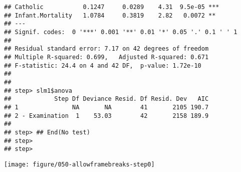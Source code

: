 \documentclass{beamer}\usepackage{graphicx, color}
\makeatletter
\def\maxwidth{ %
  \ifdim\Gin@nat@width>\linewidth
    \linewidth
  \else
    \Gin@nat@width
  \fi
}
\newenvironment{knitrout}{}{} %
\makeatother
\begin{document}
\begin{frame}
\begin{knitrout}
\begin{verbatim}
## Catholic           0.1247     0.0289    4.31  9.5e-05 ***
## Infant.Mortality   1.0784     0.3819    2.82   0.0072 ** 
## ---
## Signif. codes:  0 '***' 0.001 '**' 0.01 '*' 0.05 '.' 0.1 ' ' 1 
## 
## Residual standard error: 7.17 on 42 degrees of freedom
## Multiple R-squared: 0.699,	Adjusted R-squared: 0.671 
## F-statistic: 24.4 on 4 and 42 DF,  p-value: 1.72e-10 
## 
## 
## step> slm1$anova
##            Step Df Deviance Resid. Df Resid. Dev   AIC
## 1               NA       NA        41       2105 190.7
## 2 - Examination  1    53.03        42       2158 189.9
## 
## step> ## End(No test)
## step> 
## step>
\end{verbatim}
\texttt{[image: figure/050-allowframebreaks-step0]} 
\end{knitrout}

\end{frame}
\end{document}
